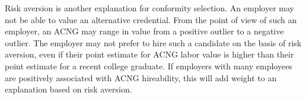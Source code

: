 \documentclass[review]{elsarticle}
\begin{document}
Risk aversion is another explanation for conformity selection.
An employer may not be able to value an alternative credential.
From the point of view of such an employer, an ACNG may range in value from a positive outlier to a negative outlier.
The employer may not prefer to hire such a candidate on the basis of risk aversion,
even if their point estimate for ACNG labor value is higher than their point estimate for a recent college graduate.
If employers with many employees are positively associated with ACNG hireability, this will add weight to an explanation based on risk aversion.
\end{document}

